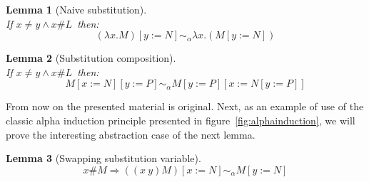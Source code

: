 \documentclass[preprint,10pt]{sigplanconf}
\newcommand{\lam}{\ensuremath{\lambda}}
\newcommand{\alpsym}{\ensuremath{\sim_\alpha}}
\newtheorem{lemma}{Lemma}
\begin{document}
\begin{lemma}[Naive substitution]
\hfill \\
  \label{naivesubst}
  If $x \neq y \wedge x \# L$\ then:
    \[   (\lam x . M) [y := N]  \alpsym \lam x .(M [y := N])  \]
\end{lemma}


\begin{lemma}[Substitution composition]
\hfill \\
  \label{substcomp}
  If $x \neq y \wedge x\# L$\ then:
    \[   M [x := N] [y := P] \alpsym M [y := P] [x := N [y := P]]  \]
\end{lemma}

From now on the presented material is original. Next, as an example of use of the classic alpha induction principle presented in figure~\ref{fig:alphainduction}, we will prove the interesting abstraction case of the next lemma.

\begin{lemma}[Swapping substitution variable]
\label{pequiv}
\[ x \# M  \Rightarrow ((x\ y) M) [x:=N] \alpsym  M [y := N] \]
\end{lemma}
\end{document}
